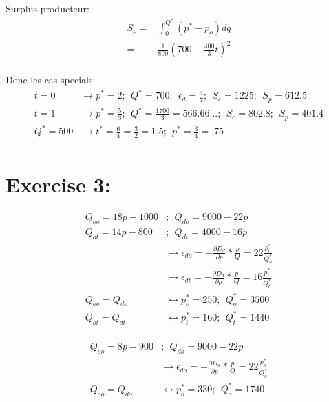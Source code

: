\documentclass[12pt]{report}
\numberwithin{equation}{section}
\begin{document}
Surplus producteur:
\begin{align*}
S_p = &\int^{Q^*}_{0} (p^* - p_o)dq \\
= & \frac{1}{800} \left( 700 - \frac{400}{3}t \right)^2 \\
\end{align*}

Donc les cas specials:
\begin{align*}
t = 0 &\rightarrow p^* = 2; ~~ Q^*= 700;  ~~ \epsilon_d = \frac{4}{7};  ~~S_c = 1225; ~~ S_p = 612.5\\
t = 1 &\rightarrow p^* = \frac{5}{3}; ~~ Q^*= \frac{1700}{3}= 566.66...;  ~~ S_c = 802.8;  ~~  S_p = 401.4 \\
Q^*= 500 &\rightarrow  t^*= \frac{6}{4}=\frac{3}{2}=1.5; ~~ p^* = \frac{3}{4}=.75\\
\end{align*}

\section{Exercise 3:}

\begin{align*}
Q_{oo} = 18p-1000 &; ~~Q_{do} = 9000-22p \\
Q_{ot} = 14p-800 &; ~~Q_{dt} = 4000-16p \\
&\rightarrow \epsilon_{do} = -\frac{\partial D_d}{\partial p}*\frac{p}{Q}=22 \frac{p_o^*}{Q_o^*} \\
&\rightarrow \epsilon_{dt} = -\frac{\partial D_d}{\partial p}*\frac{p}{Q}=16 \frac{p_t^*}{Q_t^*} \\
Q_{oo} = Q_{do}  
&\leftrightarrow p_o^* = 250 ; ~~ Q_o^*=3500 \\
Q_{ot} = Q_{dt}   
&\leftrightarrow p_t^* = 160 ; ~~ Q_t^*=1440 \\ 
\end{align*}

\begin{align*}
Q_{oo} = 8p-900 &; ~~Q_{do} = 9000-22p \\
&\rightarrow \epsilon_{do} = -\frac{\partial D_d}{\partial p}*\frac{p}{Q}=22 \frac{p_o^*}{Q_o^*} \\
Q_{oo} = Q_{do}  
&\leftrightarrow p_o^* = 330 ; ~~ Q_o^*=1740 \\
\end{align*}




\end{document}
